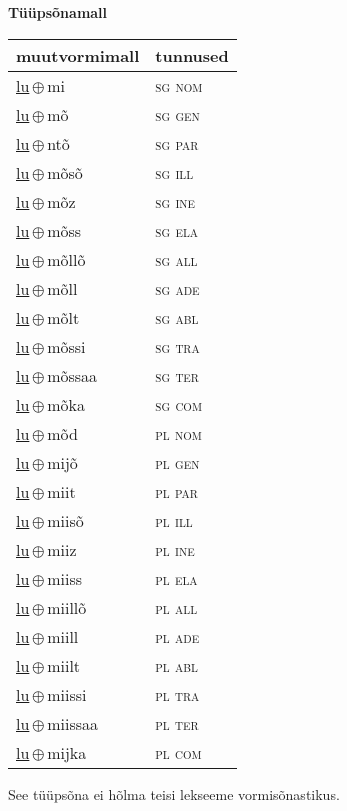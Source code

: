 

\vspace{3.5em}
\noindent \begin{minipage}{\textwidth}
\noindent \textbf{Tüüpsõnamall \,}\\

\begin{sideways}
\begin{tabular}{l l}
muutvormimall & tunnused \\
\hline
\underline{lu}\,$\oplus$\,mi & \textsc{ sg nom } \\
\underline{lu}\,$\oplus$\,mõ & \textsc{ sg gen } \\
\underline{lu}\,$\oplus$\,ntõ & \textsc{ sg par } \\
\underline{lu}\,$\oplus$\,mõsõ & \textsc{ sg ill } \\
\underline{lu}\,$\oplus$\,mõz & \textsc{ sg ine } \\
\underline{lu}\,$\oplus$\,mõss & \textsc{ sg ela } \\
\underline{lu}\,$\oplus$\,mõllõ & \textsc{ sg all } \\
\underline{lu}\,$\oplus$\,mõll & \textsc{ sg ade } \\
\underline{lu}\,$\oplus$\,mõlt & \textsc{ sg abl } \\
\underline{lu}\,$\oplus$\,mõssi & \textsc{ sg tra } \\
\underline{lu}\,$\oplus$\,mõssaa & \textsc{ sg ter } \\
\underline{lu}\,$\oplus$\,mõka & \textsc{ sg com } \\
\underline{lu}\,$\oplus$\,mõd & \textsc{ pl nom } \\
\underline{lu}\,$\oplus$\,mijõ & \textsc{ pl gen } \\
\underline{lu}\,$\oplus$\,miit & \textsc{ pl par } \\
\underline{lu}\,$\oplus$\,miisõ & \textsc{ pl ill } \\
\underline{lu}\,$\oplus$\,miiz & \textsc{ pl ine } \\
\underline{lu}\,$\oplus$\,miiss & \textsc{ pl ela } \\
\underline{lu}\,$\oplus$\,miillõ & \textsc{ pl all } \\
\underline{lu}\,$\oplus$\,miill & \textsc{ pl ade } \\
\underline{lu}\,$\oplus$\,miilt & \textsc{ pl abl } \\
\underline{lu}\,$\oplus$\,miissi & \textsc{ pl tra } \\
\underline{lu}\,$\oplus$\,miissaa & \textsc{ pl ter } \\
\underline{lu}\,$\oplus$\,mijka & \textsc{ pl com } \\
\end{tabular}
\end{sideways}
\label{tab:tüüpsõnamall-lumi}

\end{minipage}

 
\vspace{1em}
\noindent See tüüpsõna ei hõlma teisi lekseeme vormi\-sõnastikus.
